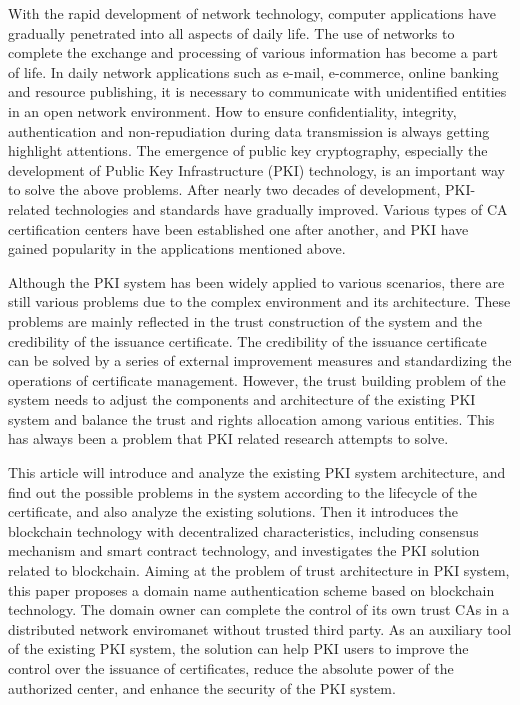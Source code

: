 \begin{eabstract}
With the rapid development of network technology, computer applications have gradually penetrated into all aspects of daily life. The use of networks to complete the exchange and processing of various information has become a part of life. In daily network applications such as e-mail, e-commerce, online banking and resource publishing, it is necessary to communicate with unidentified entities in an open network environment. How to ensure confidentiality, integrity, authentication and non-repudiation during data transmission is always getting highlight attentions. The emergence of public key cryptography, especially the development of Public Key Infrastructure (PKI) technology, is an important way to solve the above problems. After nearly two decades of development, PKI-related technologies and standards have gradually improved. Various types of CA certification centers have been established one after another, and PKI have gained popularity in the applications mentioned above.

Although the PKI system has been widely applied to various scenarios, there are still various problems due to the complex environment and its architecture. These problems are mainly reflected in the trust construction of the system and the credibility of the issuance certificate. The credibility of the issuance certificate can be solved by a series of external improvement measures and standardizing the operations of certificate management. However, the trust building problem of the system needs to adjust the components and architecture of the existing PKI system and balance the trust and rights allocation among various entities. This has always been a problem that PKI related research attempts to solve.

This article will introduce and analyze the existing PKI system architecture, and find out the possible problems in the system according to the lifecycle of the certificate, and also analyze the existing solutions. Then it introduces the blockchain technology with decentralized characteristics, including consensus mechanism and smart contract technology, and investigates the PKI solution related to blockchain. Aiming at the problem of trust architecture in PKI system, this paper proposes a domain name authentication scheme based on blockchain technology. The domain owner can complete the control of its own trust CAs in a distributed network enviromanet without trusted third party. As an auxiliary tool of the existing PKI system, the solution can help PKI users to improve the control over the issuance of certificates, reduce the absolute power of the authorized center, and enhance the security of the PKI system.


\end{eabstract}
